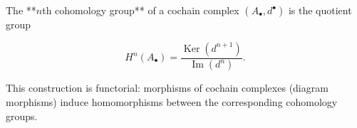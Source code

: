 The **$n$th cohomology group** of a cochain complex $(A_\bullet, d^\bullet)$ is the quotient group

$$H^n(A_\bullet) = \frac{\operatorname{Ker}(d^{n+1})}{\operatorname{Im}(d^n)}.$$

This construction is functorial: morphisms of cochain complexes (diagram morphisms) induce homomorphisms between the corresponding cohomology groups.
